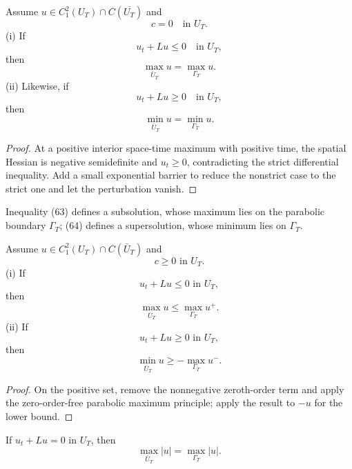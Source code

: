 \begin{theorem}
\label{thm:parabolic-weak-maximum-principle}
Assume $u \in C^2_1(U_T) \cap C(\overline{U_T})$ and
\[
c = 0 \quad \text{in } U_T.
\tag{62}
\]
(i) If
\[
u_t + Lu \leq 0 \quad \text{in } U_T,
\tag{63}
\]
then
\[
\max_{\bar U_T} u = \max_{\Gamma_T} u.
\]
(ii) Likewise, if
\[
u_t + Lu \geq 0 \quad \text{in } U_T,
\tag{64}
\]
then
\[
\min_{\bar U_T} u = \min_{\Gamma_T} u.
\]
\end{theorem}

\begin{proof}
\sketch At a positive interior space-time maximum with positive time, the spatial Hessian is negative semidefinite and $u_t\ge0$, contradicting the strict differential inequality. Add a small exponential barrier to reduce the nonstrict case to the strict one and let the perturbation vanish.
\end{proof}

\begin{remark}
\label{rem:parabolic-subsolution-supersolution}
Inequality (63) defines a subsolution, whose maximum lies on the parabolic boundary $\Gamma_T$; (64) defines a supersolution, whose minimum lies on $\Gamma_T$.
\end{remark}

\begin{theorem}
\label{thm:parabolic-weak-maximum-principle-c-nonneg}
Assume $u \in C_1^2(U_T) \cap C(\bar{U}_T)$ and
\[
c \geq 0 \text{ in } U_T.
\]
(i) If
\[
u_t + Lu \leq 0 \text{ in } U_T,
\]
then
\[
\max_{\bar{U}_T} u \leq \max_{\Gamma_T} u^+.
\]
(ii) If
\[
u_t + Lu \geq 0 \text{ in } U_T,
\]
then
\[
\min_{\bar{U}_T} u \geq - \max_{\Gamma_T} u^-.
\]
\end{theorem}

\begin{proof}
\sketch On the positive set, remove the nonnegative zeroth-order term and apply the zero-order-free parabolic maximum principle; apply the result to $-u$ for the lower bound.
\end{proof}

\begin{remark}
\label{rem:parabolic-weak-max-principle-abs-value}
If $u_t+Lu=0$ in $U_T$, then
\[
\max_{\bar U_T}|u|=\max_{\Gamma_T}|u|.
\]
\end{remark}

